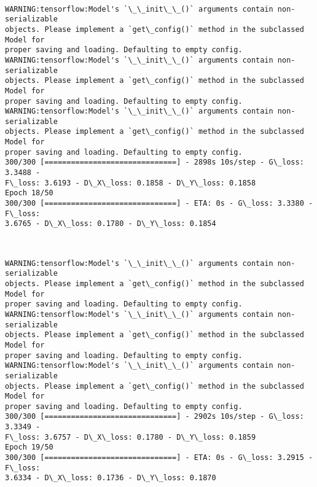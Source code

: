 \documentclass[11pt]{article}
\begin{document}
    \begin{center}
    \end{center}
    { \hspace*{\fill} \\}
    
    \begin{Verbatim}[commandchars=\\\{\}]
WARNING:tensorflow:Model's `\_\_init\_\_()` arguments contain non-serializable
objects. Please implement a `get\_config()` method in the subclassed Model for
proper saving and loading. Defaulting to empty config.
WARNING:tensorflow:Model's `\_\_init\_\_()` arguments contain non-serializable
objects. Please implement a `get\_config()` method in the subclassed Model for
proper saving and loading. Defaulting to empty config.
WARNING:tensorflow:Model's `\_\_init\_\_()` arguments contain non-serializable
objects. Please implement a `get\_config()` method in the subclassed Model for
proper saving and loading. Defaulting to empty config.
300/300 [==============================] - 2898s 10s/step - G\_loss: 3.3488 -
F\_loss: 3.6193 - D\_X\_loss: 0.1858 - D\_Y\_loss: 0.1858
Epoch 18/50
300/300 [==============================] - ETA: 0s - G\_loss: 3.3380 - F\_loss:
3.6765 - D\_X\_loss: 0.1780 - D\_Y\_loss: 0.1854
    \end{Verbatim}

    \begin{center}
    \end{center}
    { \hspace*{\fill} \\}
    
    \begin{Verbatim}[commandchars=\\\{\}]
WARNING:tensorflow:Model's `\_\_init\_\_()` arguments contain non-serializable
objects. Please implement a `get\_config()` method in the subclassed Model for
proper saving and loading. Defaulting to empty config.
WARNING:tensorflow:Model's `\_\_init\_\_()` arguments contain non-serializable
objects. Please implement a `get\_config()` method in the subclassed Model for
proper saving and loading. Defaulting to empty config.
WARNING:tensorflow:Model's `\_\_init\_\_()` arguments contain non-serializable
objects. Please implement a `get\_config()` method in the subclassed Model for
proper saving and loading. Defaulting to empty config.
300/300 [==============================] - 2902s 10s/step - G\_loss: 3.3349 -
F\_loss: 3.6757 - D\_X\_loss: 0.1780 - D\_Y\_loss: 0.1859
Epoch 19/50
300/300 [==============================] - ETA: 0s - G\_loss: 3.2915 - F\_loss:
3.6334 - D\_X\_loss: 0.1736 - D\_Y\_loss: 0.1870
    \end{Verbatim}
\end{document}
